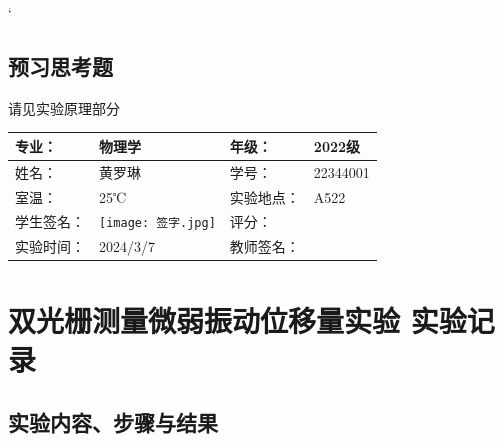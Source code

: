 \documentclass[dvipsnames, svgnames,a4paper,11pt]{article}
\begin{document}
	`
	
	\subsection{预习思考题}
	请见实验原理部分

	
	
	
	
	\clearpage
	
	\begin{table}
		\renewcommand\arraystretch{1.7}
		\centering
		\begin{tabularx}{\textwidth}{|X|X|X|X|}
			\hline
			专业： & 物理学 & 年级： & 2022级 \\
			\hline
			姓名： & 黄罗琳 & 学号： & 22344001\\
			\hline
			室温： &  25℃& 实验地点： & A522 \\
			\hline
			学生签名： & \texttt{[image: 签字.jpg]} &
    评分： & \\
			\hline
			实验时间：& 2024/3/7 & 教师签名：&\\
			\hline
		\end{tabularx}
	\end{table}
	
	\section{双光栅测量微弱振动位移量实验 \quad\heiti 实验记录}
	
	\subsection{实验内容、步骤与结果}
	
\end{document}
